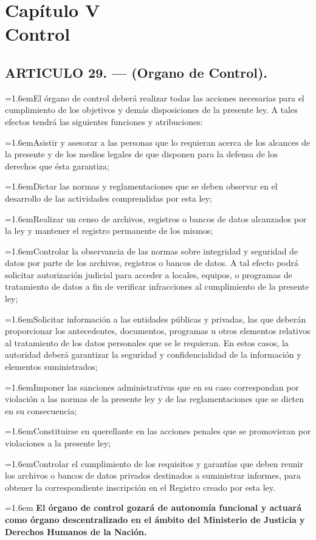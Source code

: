 \documentclass[10pt,a4paper]{article}
\newcommand{\capitulo}[2]{\section[#1 --- #2]{#1\\[2pt]#2}}
\newcommand{\articulo}[1]{\subsection{#1}}
\newcommand{\inciso}[2]{\par{\hangindent=1.6em\hangafter=1\makebox[1.6em][l]{#1}#2\par}}
\begin{document}
\capitulo{Capítulo V}{Control}
\articulo{ARTICULO 29. — (Organo de Control).}
\inciso{1.}{El órgano de control deberá realizar todas las acciones necesarias para el cumplimiento de los objetivos y demás disposiciones de la presente ley. A tales efectos tendrá las siguientes funciones y atribuciones:}

\inciso{a)}{Asistir y asesorar a las personas que lo requieran acerca de los alcances de la presente y de los medios legales de que disponen para la defensa de los derechos que ésta garantiza;}

\inciso{b)}{Dictar las normas y reglamentaciones que se deben observar en el desarrollo de las actividades comprendidas por esta ley;}

\inciso{c)}{Realizar un censo de archivos, registros o bancos de datos alcanzados por la ley y mantener el registro permanente de los mismos;}

\inciso{d)}{Controlar la observancia de las normas sobre integridad y seguridad de datos por parte de los archivos, registros o bancos de datos. A tal efecto podrá solicitar autorización judicial para acceder a locales, equipos, o programas de tratamiento de datos a fin de verificar infracciones al cumplimiento de la presente ley;}

\inciso{e)}{Solicitar información a las entidades públicas y privadas, las que deberán proporcionar los antecedentes, documentos, programas u otros elementos relativos al tratamiento de los datos personales que se le requieran. En estos casos, la autoridad deberá garantizar la seguridad y confidencialidad de la información y elementos suministrados;}

\inciso{f)}{Imponer las sanciones administrativas que en su caso correspondan por violación a las normas de la presente ley y de las reglamentaciones que se dicten en su consecuencia;}

\inciso{g)}{Constituirse en querellante en las acciones penales que se promovieran por violaciones a la presente ley;}

\inciso{h)}{Controlar el cumplimiento de los requisitos y garantías que deben reunir los archivos o bancos de datos privados destinados a suministrar informes, para obtener la correspondiente inscripción en el Registro creado por esta ley.}

\inciso{2.}{\textbf{ El órgano de control gozará de autonomía funcional y actuará como órgano descentralizado en el ámbito del Ministerio de Justicia y Derechos Humanos de la Nación.}}
\end{document}
